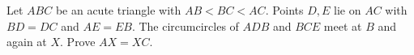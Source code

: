 Let $ABC$ be an acute triangle with $AB<BC<AC$. Points $D,E$ lie on $AC$ with $BD=DC$ and $AE=EB$. The circumcircles of $ADB$ and $BCE$ meet at $B$ and again at $X$. Prove $AX=XC$.
